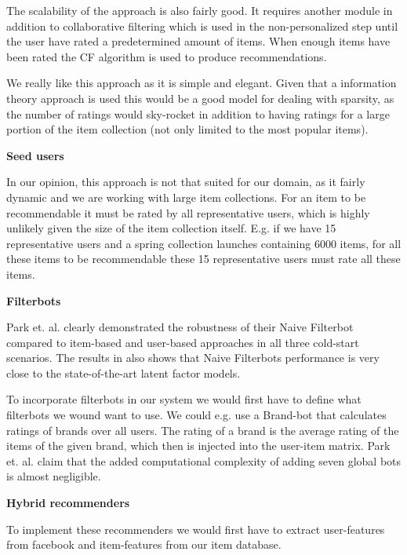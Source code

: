 The scalability of the approach is also fairly good. It requires another module in addition to collaborative filtering which is used in the non-personalized step until the user have rated a predetermined amount of items. When enough items have been rated the CF algorithm is used to produce recommendations.

We really like this approach as it is simple and elegant. Given that a information theory approach is used this would be a good model for dealing with sparsity, as the number of ratings would sky-rocket in addition to having ratings for a large portion of the item collection (not only limited to the most popular items).

\textbf{Seed users}

In our opinion, this approach is not that suited for our domain, as it fairly dynamic and we are working with large item collections. For an item to be recommendable it must be rated by all representative users, which is highly unlikely given the size of the item collection itself. E.g. if we have 15 representative users and a spring collection launches containing 6000 items, for all these items to be recommendable these 15 representative users must rate all these items.

\textbf{Filterbots}

Park et. al. \cite{Park2006} clearly demonstrated the robustness of their Naive Filterbot compared to item-based and user-based approaches in all three cold-start scenarios. The results in \cite{Agarwal2009, Agarwal2010} also shows that Naive Filterbots performance is very close to the state-of-the-art latent factor models.

To incorporate filterbots in our system we would first have to define what filterbots we wound want to use. We could e.g. use a Brand-bot that calculates ratings of brands over all users. The rating of a brand is the average rating of the items of the given brand, which then is injected into the user-item matrix. 
Park et. al. \cite{Park2006} claim that the added computational complexity of adding seven global bots is almost negligible.


\textbf{Hybrid recommenders}

To implement these recommenders we would first have to extract user-features from facebook and item-features from our item database. 


